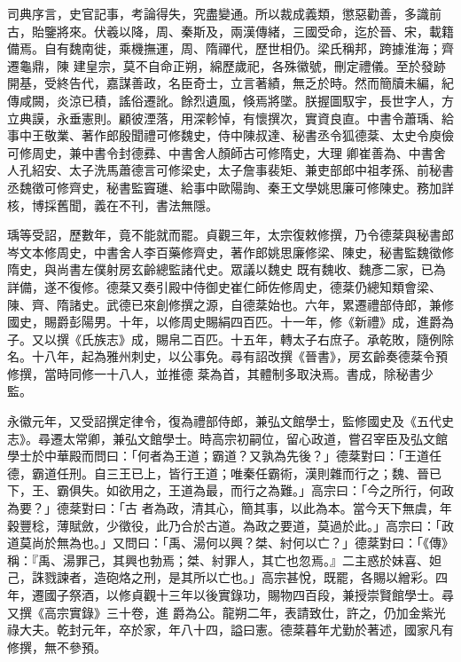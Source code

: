 \begin{pinyinscope}
 司典序言，史官記事，考論得失，究盡變通。所以裁成義類，懲惡勸善，多識前古，貽鑒將來。伏羲以降，周、秦斯及，兩漢傳緒，三國受命，迄於晉、宋，載籍備焉。自有魏南徙，乘機撫運，周、隋禪代，歷世相仍。梁氏稱邦，跨據淮海；齊遷龜鼎，陳
 建皇宗，莫不自命正朔，綿歷歲祀，各殊徽號，刪定禮儀。至於發跡開基，受終告代，嘉謀善政，名臣奇士，立言著績，無乏於時。然而簡牘未編，紀傳咸闕，炎涼已積，謠俗遷訛。餘烈遺風，倏焉將墜。朕握圖馭宇，長世字人，方立典謨，永垂憲則。顧彼湮落，用深軫悼，有懷撰次，實資良直。中書令蕭瑀、給事中王敬業、著作郎殷聞禮可修魏史，侍中陳叔達、秘書丞令狐德棻、太史令庾儉可修周史，兼中書令封德彞、中書舍人顏師古可修隋史，大理
 卿崔善為、中書舍人孔紹安、太子洗馬蕭德言可修梁史，太子詹事裴矩、兼吏部郎中祖孝孫、前秘書丞魏徵可修齊史，秘書監竇璡、給事中歐陽詢、秦王文學姚思廉可修陳史。務加詳核，博採舊聞，義在不刊，書法無隱。



 瑀等受詔，歷數年，竟不能就而罷。貞觀三年，太宗復敕修撰，乃令德棻與秘書郎岑文本修周史，中書舍人李百藥修齊史，著作郎姚思廉修梁、陳史，秘書監魏徵修隋史，與尚書左僕射房玄齡總監諸代史。眾議以魏史
 既有魏收、魏彥二家，已為詳備，遂不復修。德棻又奏引殿中侍御史崔仁師佐修周史，德棻仍總知類會梁、陳、齊、隋諸史。武德已來創修撰之源，自德棻始也。六年，累遷禮部侍郎，兼修國史，賜爵彭陽男。十年，以修周史賜絹四百匹。十一年，修《新禮》成，進爵為子。又以撰《氏族志》成，賜帛二百匹。十五年，轉太子右庶子。承乾敗，隨例除名。十八年，起為雅州刺史，以公事免。尋有詔改撰《晉書》，房玄齡奏德棻令預修撰，當時同修一十八人，並推德
 棻為首，其體制多取決焉。書成，除秘書少監。



 永徽元年，又受詔撰定律令，復為禮部侍郎，兼弘文館學士，監修國史及《五代史志》。尋遷太常卿，兼弘文館學士。時高宗初嗣位，留心政道，嘗召宰臣及弘文館學士於中華殿而問曰：「何者為王道；霸道？又孰為先後？」德棻對曰：「王道任德，霸道任刑。自三王已上，皆行王道；唯秦任霸術，漢則雜而行之；魏、晉已下，王、霸俱失。如欲用之，王道為最，而行之為難。」高宗曰：「今之所行，何政為要？」德棻對曰：「古
 者為政，清其心，簡其事，以此為本。當今天下無虞，年穀豐稔，薄賦斂，少徵役，此乃合於古道。為政之要道，莫過於此。」高宗曰：「政道莫尚於無為也。」又問曰：「禹、湯何以興？桀、紂何以亡？」德棻對曰：「《傳》稱：『禹、湯罪己，其興也勃焉；桀、紂罪人，其亡也忽焉。』二主惑於妹喜、妲己，誅戮諫者，造砲烙之刑，是其所以亡也。」高宗甚悅，既罷，各賜以繒彩。四年，遷國子祭酒，以修貞觀十三年以後實錄功，賜物四百段，兼授崇賢館學士。尋又撰《高宗實錄》三十卷，進
 爵為公。龍朔二年，表請致仕，許之，仍加金紫光祿大夫。乾封元年，卒於家，年八十四，謚曰憲。德棻暮年尤勤於著述，國家凡有修撰，無不參預。




\end{pinyinscope}

